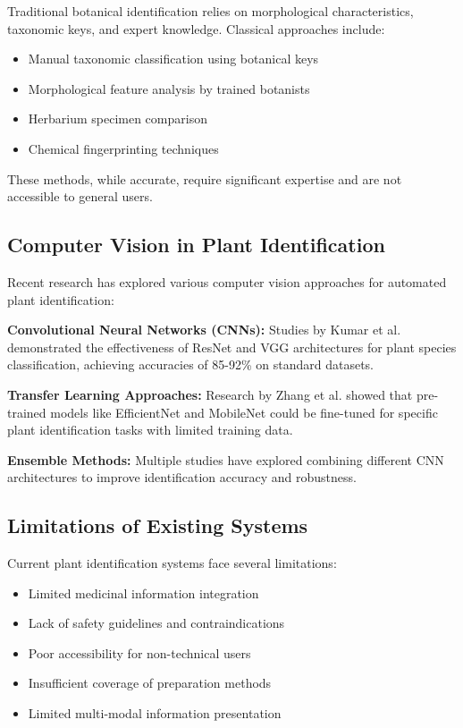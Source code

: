 \documentclass[conference]{IEEEtran}
\begin{document}
Traditional botanical identification relies on morphological characteristics, taxonomic keys, and expert knowledge. Classical approaches include:

\begin{itemize}
\item Manual taxonomic classification using botanical keys
\item Morphological feature analysis by trained botanists
\item Herbarium specimen comparison
\item Chemical fingerprinting techniques
\end{itemize}

These methods, while accurate, require significant expertise and are not accessible to general users.

\subsection{Computer Vision in Plant Identification}

Recent research has explored various computer vision approaches for automated plant identification:

\textbf{Convolutional Neural Networks (CNNs):} Studies by Kumar et al. \cite{Kumar2020} demonstrated the effectiveness of ResNet and VGG architectures for plant species classification, achieving accuracies of 85-92\% on standard datasets.

\textbf{Transfer Learning Approaches:} Research by Zhang et al. \cite{Zhang2021} showed that pre-trained models like EfficientNet and MobileNet could be fine-tuned for specific plant identification tasks with limited training data.

\textbf{Ensemble Methods:} Multiple studies have explored combining different CNN architectures to improve identification accuracy and robustness.

\subsection{Limitations of Existing Systems}

Current plant identification systems face several limitations:

\begin{itemize}
\item Limited medicinal information integration
\item Lack of safety guidelines and contraindications
\item Poor accessibility for non-technical users
\item Insufficient coverage of preparation methods
\item Limited multi-modal information presentation
\end{itemize}
\end{document}
